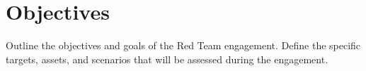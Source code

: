 \section*{Objectives}

Outline the objectives and goals of the Red Team engagement. Define the specific targets, assets, and scenarios that will be assessed during the engagement.
